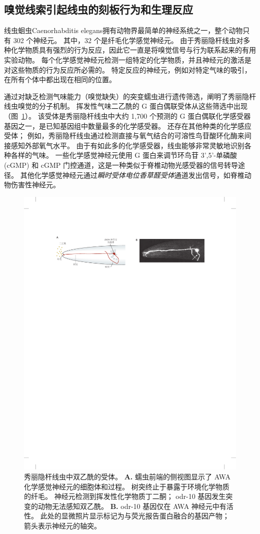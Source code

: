 \subsection{嗅觉线索引起线虫的刻板行为和生理反应}

线虫蛔虫Caenorhabditis elegans拥有动物界最简单的神经系统之一，整个动物只有 302 个神经元。
其中，32 个是纤毛化学感觉神经元。
由于秀丽隐杆线虫对多种化学物质具有强烈的行为反应，因此它一直是将嗅觉信号与行为联系起来的有用实验动物。
每个化学感觉神经元检测一组特定的化学物质，并且神经元的激活是对这些物质的行为反应所必需的。
特定反应的神经元，例如对特定气味的吸引，在所有个体中都出现在相同的位置。


通过对缺乏检测气味能力（嗅觉缺失）的突变蠕虫进行遗传筛选，阐明了秀丽隐杆线虫嗅觉的分子机制。
挥发性气味二乙酰的 G 蛋白偶联受体从这些筛选中出现（图~\ref{fig:29_11}）。
该受体是秀丽隐杆线虫中大约 1,700 个预测的 G 蛋白偶联化学感受器基因之一，是已知基因组中数量最多的化学感受器。
还存在其他种类的化学感应受体；
例如，秀丽隐杆线虫通过检测直接与氧气结合的可溶性鸟苷酸环化酶来间接感知外部氧气水平。
由于有如此多的化学感受器，线虫能够非常灵敏地识别各种各样的气味。
一些化学感觉神经元使用 G 蛋白来调节环鸟苷 3',5'-单磷酸 (cGMP) 和 cGMP 门控通道，这是一种类似于脊椎动物光感受器的信号转导途径。
其他化学感觉神经元通过\textit{瞬时受体电位香草醛受体}通道发出信号，如脊椎动物伤害性神经元。


\begin{figure}[htbp]
	\centering
	\includegraphics[width=0.75\linewidth]{chap29/fig_29_11}
	\caption{秀丽隐杆线虫中双乙酰的受体。
		\textbf{A.} 蠕虫前端的侧视图显示了 AWA 化学感觉神经元的细胞体和过程。
		树突终止于暴露于环境化学物质的纤毛。
		神经元检测到挥发性化学物质丁二酮；
		odr-10 基因发生突变的动物无法感知双乙酰。
		\textbf{B.} odr-10 基因仅在 AWA 神经元中有活性。
		此处的显微照片显示标记为与荧光报告蛋白融合的基因产物；
		箭头表示神经元的轴突。}
	\label{fig:29_11}
\end{figure}


